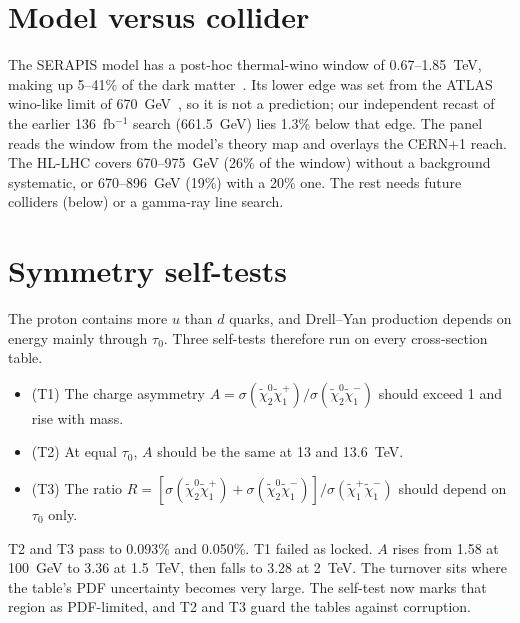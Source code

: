 \documentclass[aps,prd,twocolumn,superscriptaddress,nofootinbib,showkeys]{revtex4-2}
\begin{document}
\section{Model versus collider}
The SERAPIS model has a post-hoc thermal-wino window of 0.67--1.85~TeV, making up 5--41\% of the dark matter~\cite{SE}. Its lower edge was set from the ATLAS wino-like limit of 670~GeV~\cite{AT26}, so it is not a prediction; our independent recast of the earlier 136~fb$^{-1}$ search (661.5~GeV) lies 1.3\% below that edge. The panel reads the window from the model's theory map and overlays the CERN+1 reach. The HL-LHC covers 670--975~GeV (26\% of the window) without a background systematic, or 670--896~GeV (19\%) with a 20\% one. The rest needs future colliders (below) or a gamma-ray line search.

\section{Symmetry self-tests}
The proton contains more $u$ than $d$ quarks, and Drell--Yan production depends on energy mainly through $\tau_0$. Three self-tests therefore run on every cross-section table.
\begin{itemize}
\item (T1) The charge asymmetry $A=\sigma(\tilde\chi_2^0\tilde\chi_1^+)/\sigma(\tilde\chi_2^0\tilde\chi_1^-)$ should exceed 1 and rise with mass.
\item (T2) At equal $\tau_0$, $A$ should be the same at 13 and 13.6~TeV.
\item (T3) The ratio $R=[\sigma(\tilde\chi_2^0\tilde\chi_1^+)+\sigma(\tilde\chi_2^0\tilde\chi_1^-)]/\sigma(\tilde\chi_1^+\tilde\chi_1^-)$ should depend on $\tau_0$ only.
\end{itemize}
T2 and T3 pass to 0.093\% and 0.050\%. T1 failed as locked. $A$ rises from 1.58 at 100~GeV to 3.36 at 1.5~TeV, then falls to 3.28 at 2~TeV. The turnover sits where the table's PDF uncertainty becomes very large. The self-test now marks that region as PDF-limited, and T2 and T3 guard the tables against corruption.
\end{document}
